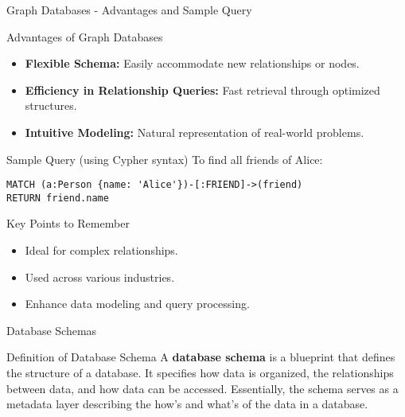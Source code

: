 \documentclass[aspectratio=169]{beamer}
\begin{document}
\begin{frame}[fragile]{Graph Databases - Advantages and Sample Query}
    \begin{block}{Advantages of Graph Databases}
        \begin{itemize}
            \item \textbf{Flexible Schema:} Easily accommodate new relationships or nodes.
            \item \textbf{Efficiency in Relationship Queries:} Fast retrieval through optimized structures.
            \item \textbf{Intuitive Modeling:} Natural representation of real-world problems.
        \end{itemize}
    \end{block}
    
    \begin{block}{Sample Query (using Cypher syntax)}
        To find all friends of Alice:
        \begin{lstlisting}
MATCH (a:Person {name: 'Alice'})-[:FRIEND]->(friend)
RETURN friend.name
        \end{lstlisting}
    \end{block}
    
    \begin{block}{Key Points to Remember}
        \begin{itemize}
            \item Ideal for complex relationships.
            \item Used across various industries.
            \item Enhance data modeling and query processing.
        \end{itemize}
    \end{block}
\end{frame}

\begin{frame}[fragile]{Database Schemas}
    \begin{block}{Definition of Database Schema}
        A \textbf{database schema} is a blueprint that defines the structure of a database. It specifies how data is organized, the relationships between data, and how data can be accessed. Essentially, the schema serves as a metadata layer describing the how's and what's of the data in a database.
    \end{block}
\end{frame}
\end{document}
